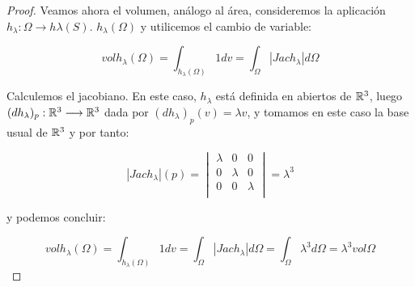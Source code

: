 \begin{proof}
Veamos ahora el volumen, análogo al área, consideremos la aplicación $h_\lambda: \Omega \longrightarrow h\lambda(S)$. $h_\lambda(\Omega)$ y utilicemos el cambio de variable:

\begin{equation*}
    vol h_\lambda(\Omega) = \int_{h_\lambda(\Omega)} 1dv = \int_{\Omega} |Jac h_\lambda| d\Omega
\end{equation*}

Calculemos el jacobiano. En este caso, $h_\lambda$ está definida en abiertos de $\mathbb{R}^3$, luego $(dh_\lambda)_p: \mathbb{R}^3 \longrightarrow \mathbb{R}^3$ dada por $(dh_\lambda)_p(v) = \lambda v$, y tomamos en este caso la base usual de $\mathbb{R}^3$ y por tanto:

\begin{equation*}
  |Jac h_\lambda|(p) = \begin{vmatrix}
                        \lambda & 0 & 0 \\ 
                        0 & \lambda & 0 \\
                        0 & 0 & \lambda \\
                        \end{vmatrix} = \lambda^3
\end{equation*}

y podemos concluir:

\begin{equation*}
    vol h_\lambda(\Omega) = \int_{h_\lambda(\Omega)} 1dv = \int_{\Omega} |Jac h_\lambda| d\Omega = \int_{\Omega} \lambda^3 d\Omega = \lambda^3 vol \Omega
\end{equation*}

\end{proof}


